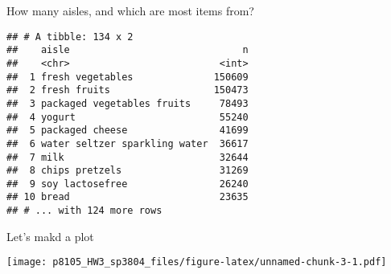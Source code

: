 \documentclass[]{article}
\newenvironment{Shaded}{\begin{snugshade}}{\end{snugshade}}
\newcommand{\CommentTok}[1]{\textcolor[rgb]{0.56,0.35,0.01}{\textit{#1}}}
\newcommand{\DataTypeTok}[1]{\textcolor[rgb]{0.13,0.29,0.53}{#1}}
\newcommand{\DecValTok}[1]{\textcolor[rgb]{0.00,0.00,0.81}{#1}}
\newcommand{\KeywordTok}[1]{\textcolor[rgb]{0.13,0.29,0.53}{\textbf{#1}}}
\newcommand{\NormalTok}[1]{#1}
\newcommand{\OperatorTok}[1]{\textcolor[rgb]{0.81,0.36,0.00}{\textbf{#1}}}
\newcommand{\StringTok}[1]{\textcolor[rgb]{0.31,0.60,0.02}{#1}}
\begin{document}
How many aisles, and which are most items from?

\begin{Shaded}
\end{Shaded}

\begin{verbatim}
## # A tibble: 134 x 2
##    aisle                              n
##    <chr>                          <int>
##  1 fresh vegetables              150609
##  2 fresh fruits                  150473
##  3 packaged vegetables fruits     78493
##  4 yogurt                         55240
##  5 packaged cheese                41699
##  6 water seltzer sparkling water  36617
##  7 milk                           32644
##  8 chips pretzels                 31269
##  9 soy lactosefree                26240
## 10 bread                          23635
## # ... with 124 more rows
\end{verbatim}

Let's makd a plot

\begin{Shaded}
\end{Shaded}

\texttt{[image: p8105\_HW3\_sp3804\_files/figure-latex/unnamed-chunk-3-1.pdf]}
\end{document}
